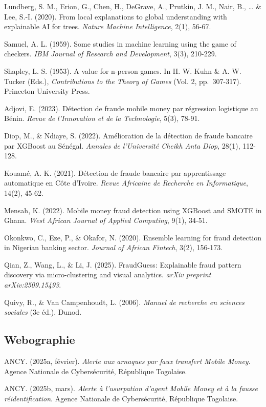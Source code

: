 \documentclass[
  12pt,
]{article}
\begin{document}
Lundberg, S. M., Erion, G., Chen, H., DeGrave, A., Prutkin, J. M., Nair,
B., … \& Lee, S.-I. (2020). From local explanations to global
understanding with explainable AI for trees. \emph{Nature Machine
Intelligence}, 2(1), 56-67.

Samuel, A. L. (1959). Some studies in machine learning using the game of
checkers. \emph{IBM Journal of Research and Development}, 3(3), 210-229.

Shapley, L. S. (1953). A value for n-person games. In H. W. Kuhn \& A.
W. Tucker (Eds.), \emph{Contributions to the Theory of Games} (Vol. 2,
pp.~307-317). Princeton University Press.

Adjovi, E. (2023). Détection de fraude mobile money par régression
logistique au Bénin. \emph{Revue de l’Innovation et de la Technologie},
5(3), 78-91.

Diop, M., \& Ndiaye, S. (2022). Amélioration de la détection de fraude
bancaire par XGBoost au Sénégal. \emph{Annales de l’Université Cheikh
Anta Diop}, 28(1), 112-128.

Kouamé, A. K. (2021). Détection de fraude bancaire par apprentissage
automatique en Côte d’Ivoire. \emph{Revue Africaine de Recherche en
Informatique}, 14(2), 45-62.

Mensah, K. (2022). Mobile money fraud detection using XGBoost and SMOTE
in Ghana. \emph{West African Journal of Applied Computing}, 9(1), 34-51.

Okonkwo, C., Eze, P., \& Okafor, N. (2020). Ensemble learning for fraud
detection in Nigerian banking sector. \emph{Journal of African Fintech},
3(2), 156-173.

Qian, Z., Wang, L., \& Li, J. (2025). FraudGuess: Explainable fraud
pattern discovery via micro-clustering and visual analytics. \emph{arXiv
preprint arXiv:2509.15493}.

Quivy, R., \& Van Campenhoudt, L. (2006). \emph{Manuel de recherche en
sciences sociales} (3e éd.). Dunod.

\subsection{Webographie}\label{webographie}

ANCY. (2025a, février). \emph{Alerte aux arnaques par faux transfert
Mobile Money}. Agence Nationale de Cybersécurité, République Togolaise.

ANCY. (2025b, mars). \emph{Alerte à l’usurpation d’agent Mobile Money et
à la fausse réidentification}. Agence Nationale de Cybersécurité,
République Togolaise.
\end{document}
